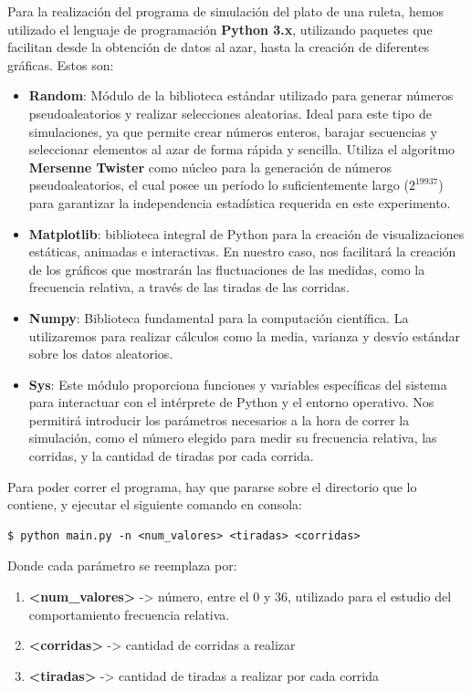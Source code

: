 \documentclass{article}
\begin{document}
Para la realización del programa de simulación del plato de una ruleta, hemos utilizado el lenguaje de programación \textbf{Python 3.x}, utilizando paquetes que facilitan desde la obtención de datos al azar, hasta la creación de diferentes gráficas. Estos son:

\begin{itemize}
    \item \textbf{Random}: Módulo de la biblioteca estándar utilizado para generar números pseudoaleatorios y realizar selecciones aleatorias. Ideal para este tipo de simulaciones, ya que permite crear números enteros, barajar secuencias y seleccionar elementos al azar de forma rápida y sencilla. Utiliza el algoritmo \textbf{Mersenne Twister} como núcleo para la generación de números pseudoaleatorios, el cual posee un período lo suficientemente largo ($2^{19937}$) para garantizar la independencia estadística requerida en este experimento.
    \item \textbf{Matplotlib}: biblioteca integral de Python para la creación de visualizaciones estáticas, animadas e interactivas. En nuestro caso, nos facilitará la creación de los gráficos que mostrarán las fluctuaciones de las medidas, como la frecuencia relativa, a través de las tiradas de las corridas.
    \item \textbf{Numpy}: Biblioteca fundamental para la computación científica. La utilizaremos para realizar cálculos como la media, varianza y desvío estándar sobre los datos aleatorios.
    \item \textbf{Sys}: Este módulo proporciona funciones y variables específicas del sistema para interactuar con el intérprete de Python y el entorno operativo. Nos permitirá introducir los parámetros necesarios a la hora de correr la simulación, como el número elegido para medir su frecuencia relativa, las corridas, y la cantidad de tiradas por cada corrida.
\end{itemize}

Para poder correr el programa, hay que pararse sobre el directorio que lo contiene, y ejecutar el siguiente comando en consola:
\begin{verbatim}
$ python main.py -n <num_valores> <tiradas> <corridas>
\end{verbatim}
Donde cada parámetro se reemplaza por:
\begin{enumerate}
    \item \textbf{<num\_valores>} -> número, entre el 0 y 36, utilizado para el estudio del comportamiento frecuencia relativa.
    \item \textbf{<corridas>} -> cantidad de corridas a realizar
    \item \textbf{<tiradas>} -> cantidad de tiradas a realizar por cada corrida
\end{enumerate}
\end{document}

